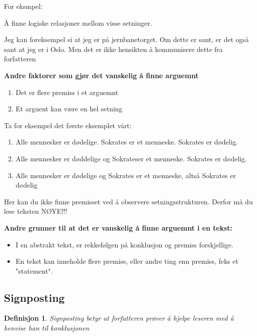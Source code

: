 \documentclass[11pt]{article}
\newtheorem{definition}{Definisjon}
\begin{document}
For eksmpel:

Å finne logiske relasjoner mellom visse setninger.

Jeg kan foreksempel si at jeg er på jernbanetorget. Om dette er sant, er det også sant at jeg er i Oslo. Men det er ikke hensikten å kommunisere dette fra forfatteren

\vspace{1em}

\textbf{Andre faktorer som gjør det vanskelig å finne arguemnt}
\begin{enumerate}
    \item Det er flere premiss i et arguemnt
    \item Et arguent kan være en hel setning
\end{enumerate}
\vspace{1em}

Ta for eksempel det første eksemplet vårt:
\vspace{1em}
\begin{enumerate}
    \item Alle mennesker er dødelige. Sokrates er et menneske. Sokrates er dødelig.
    \item Alle mennesker er døddelige og Sokrateser et menneske. Sokrates er  dødelig.
    \item Alle mennesker er dødelige og Sokrates er et menneske, altså Sokrates er dødelig
\end{enumerate}

\vspace{1em}

Her kan du ikke finne premisset ved å observere setningsstrukturen. Derfor må  du lese teksten NØYE!!!

\vspace{1em}

\textbf{Andre grunner til at det er vanskelig å finne arguemnt i en tekst:}
\begin{itemize}
    \item I en abstrakt tekst, er rekkefølgen på konklusjon og premiss forskjellige.
    \item En tekst kan inneholde flere premiss, eller andre ting enn premiss, feks et "statement".
\end{itemize}


\subsection{Signposting}

\begin{definition}
    Signposting betyr at forfatteren prøver å hjelpe leseren med å henvise han til konklusjonen
\end{definition}
\vspace{1em}
\end{document}
